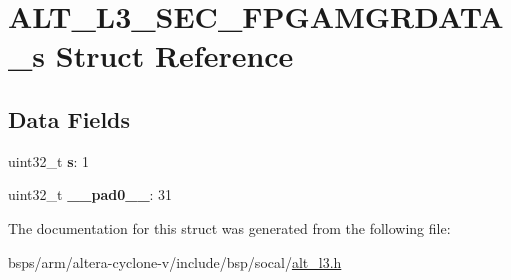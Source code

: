 \hypertarget{structALT__L3__SEC__FPGAMGRDATA__s}{}\section{A\+L\+T\+\_\+\+L3\+\_\+\+S\+E\+C\+\_\+\+F\+P\+G\+A\+M\+G\+R\+D\+A\+T\+A\+\_\+s Struct Reference}
\label{structALT__L3__SEC__FPGAMGRDATA__s}
\subsection*{Data Fields}
\begin{DoxyCompactItemize}
\item 
\mbox{\label{structALT__L3__SEC__FPGAMGRDATA__s_a0f4da13e0fc75b04498f3e1973c8481e}} 
uint32\+\_\+t {\bfseries s}\+: 1
\item 
\mbox{\label{structALT__L3__SEC__FPGAMGRDATA__s_a192404303ee4d553c315b1c16f542a1b}} 
uint32\+\_\+t {\bfseries \+\_\+\+\_\+pad0\+\_\+\+\_\+}\+: 31
\end{DoxyCompactItemize}


The documentation for this struct was generated from the following file\+:\begin{DoxyCompactItemize}
\item 
bsps/arm/altera-\/cyclone-\/v/include/bsp/socal/\mbox{\hyperlink{alt__l3_8h}{alt\+\_\+l3.\+h}}\end{DoxyCompactItemize}
